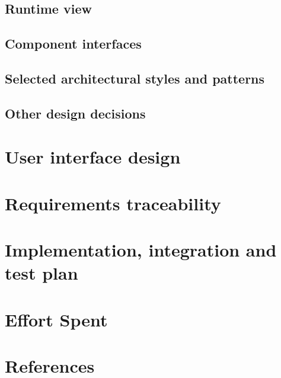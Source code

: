   \section{Runtime view}
  
  \section{Component interfaces}
  
  \section{Selected architectural styles and patterns}
  
  \section{Other design decisions}
  
  
  \chapter{User interface design}
  
  
  \chapter{Requirements traceability}
  
  
  \chapter{Implementation, integration and test plan}
  
  
  \chapter{Effort Spent}
  
  

  \chapter{References}
  
  
  

  \setupspellchecking[state=start]
